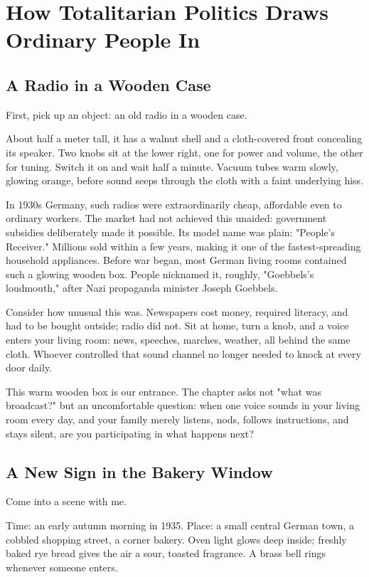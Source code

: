 \chapter[Ordinary People and Totalitarianism]{How Totalitarian Politics Draws Ordinary People In}
\section{A Radio in a Wooden Case}
First, pick up an object: an old radio in a wooden case.

About half a meter tall, it has a walnut shell and a cloth-covered front concealing its speaker. Two knobs sit at the lower right, one for power and volume, the other for tuning. Switch it on and wait half a minute. Vacuum tubes warm slowly, glowing orange, before sound seeps through the cloth with a faint underlying hiss.

In 1930s Germany, such radios were extraordinarily cheap, affordable even to ordinary workers. The market had not achieved this unaided: government subsidies deliberately made it possible. Its model name was plain: "People's Receiver." Millions sold within a few years, making it one of the fastest-spreading household appliances. Before war began, most German living rooms contained such a glowing wooden box. People nicknamed it, roughly, "Goebbels's loudmouth," after Nazi propaganda minister Joseph Goebbels.

Consider how unusual this was. Newspapers cost money, required literacy, and had to be bought outside; radio did not. Sit at home, turn a knob, and a voice enters your living room: news, speeches, marches, weather, all behind the same cloth. Whoever controlled that sound channel no longer needed to knock at every door daily.

This warm wooden box is our entrance. The chapter asks not "what was broadcast?" but an uncomfortable question: when one voice sounds in your living room every day, and your family merely listens, nods, follows instructions, and stays silent, are you participating in what happens next?

\section{A New Sign in the Bakery Window}
Come into a scene with me.

Time: an early autumn morning in 1935. Place: a small central German town, a cobbled shopping street, a corner bakery. Oven light glows deep inside; freshly baked rye bread gives the air a sour, toasted fragrance. A brass bell rings whenever someone enters.

